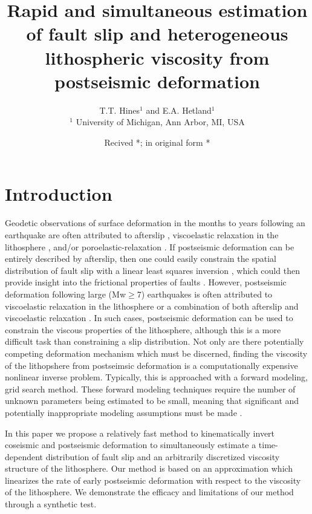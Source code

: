 \documentclass[extra]{gji}
\title{Rapid and simultaneous estimation of fault slip and
  heterogeneous lithospheric viscosity from postseismic deformation}
\author[T.T. Hines and E.A Hetland]{T.T. Hines$^1$ and E.A. Hetland$^1$\\
                    $^1$ University of Michigan, 
                         Ann Arbor, MI, USA}
\date{Recived *; in original form *}
\begin{document}
\label{firstpage}

\maketitle

\begin{summary}
\end{summary}

\begin{keywords}
\end{keywords}

\section{Introduction}
Geodetic observations of surface deformation in the months to years
following an earthquake are often attributed to afterslip
\citep[e.g.][]{M1991}, viscoelastic relaxation in the lithosphere
\citep[e.g.][]{NM1974}, and/or poroelastic-relaxation
\citep[e.g.][]{P1998,J2003}.  If postseismic deformation can be
entirely described by afterslip, then one could easily constrain the
spatial distribution of fault slip with a linear least squares
inversion \citep[e.g.][]{F2007,B2002,H1987}, which could then provide
insight into the frictional properties of faults
\citep[e.g.][]{H2006,B2009}.  However, postseismic deformation following
large (Mw$\geq$7) earthquakes is often attributed to viscoelastic
relaxation in the lithosphere \citep[e.g.][]{P2003,P2005,HH2003} or a
combination of both afterslip and viscoelastic relaxation
\citep[e.g.][]{J2009,F2006,H2008,R2015}.  In such cases, postseismic deformation
can be used to constrain the viscous properties of the lithosphere,
although this is a more difficult task than constraining a slip
distribution.  Not only are there potentially competing deformation
mechanism which must be discerned, finding the viscosity of
the lithopshere from postseimsic deformation is a computationally
expensive nonlinear inverse problem.  Typically, this is approached
with a forward modeling, grid search method.  These forward modeling
techniques require the number of unknown parameters being estimated to
be small, meaning that significant and potentially inappropriate
modeling assumptions must be made \citep{H2013,RG2008}.

In this paper we propose a relatively fast method to kinematically
invert coseismic and postseismic deformation to simultaneously
estimate a time-dependent distribution of fault slip and an
arbitrarily discretized viscosity structure of the lithosphere.  Our
method is based on an approximation which linearizes the rate of early
postseismic deformation with respect to the viscosity of the
lithosphere.  We demonstrate the efficacy and limitations of our
method through a synthetic test.
\end{document}
